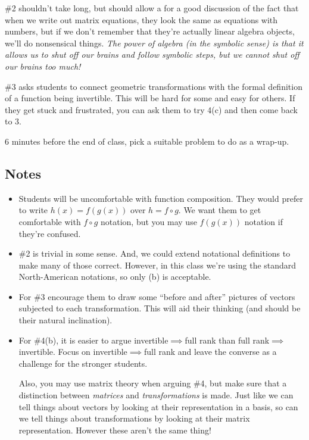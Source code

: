 \documentclass[red]{tutorial}
\theoremstyle{definition}
\theoremstyle{theorem}
\begin{document}
\begin{instructions}
		\#2 shouldn't take long, but should allow a for a good discussion of the fact that
		when we write out matrix equations, they look the same as equations with numbers, but if
		we don't remember that they're actually linear algebra objects, we'll do nonsensical things.
		\emph{The power of algebra (in the symbolic sense) is that it allows us to shut off our brains
		and follow symbolic steps, but we cannot shut off our brains too much!}

		\#3 asks students to connect geometric transformations with
		the formal definition of a function being invertible. This will be hard for some and easy for
		others. If they get stuck and frustrated, you can ask them to try 4(c) and then come back to 3.

		6 minutes before the end of class, pick a suitable problem to do as a wrap-up.

\subsection*{Notes}
	\begin{itemize}
		\item Students will be uncomfortable with function composition. They would prefer
			to write $h(x) = f(g(x))$ over $h=f\circ g$. We want them to get comfortable
			with $f\circ g$ notation, but you may use $f(g(x))$ notation if they're confused.
		\item \#2 is trivial in some sense. And, we could extend notational definitions to
			make many of those correct. However, in this class we're using the standard 
			North-American notations, so only (b) is acceptable.
		\item For \#3 encourage them to draw some ``before and after'' pictures of vectors
			subjected to each transformation. This will aid their thinking (and should
			be their natural inclination).
		\item For \#4(b), it is easier to argue invertible$\implies$full rank than 
			full rank$\implies$invertible. Focus on invertible$\implies$full rank and
			leave the converse as a challenge for the stronger students.

			Also, you may use matrix theory when arguing \#4, but make sure
			that a distinction between \emph{matrices} and \emph{transformations} is made.
			Just like we can tell things about vectors by looking
			at their representation in a basis, so can we tell things about transformations
			by looking at their matrix representation. However these aren't the same thing!
	\end{itemize}

	\end{instructions}
\end{document}
